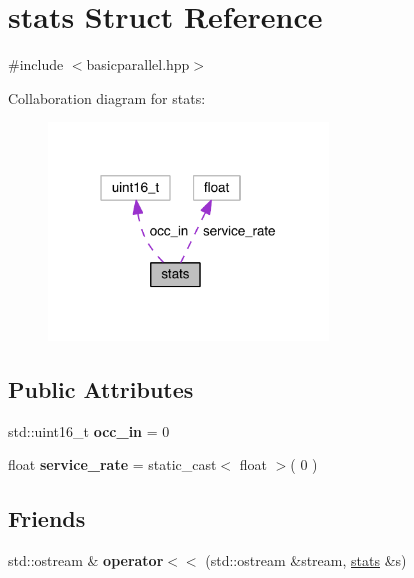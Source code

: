 \hypertarget{structstats}{}\section{stats Struct Reference}
\label{structstats}


{\ttfamily \#include $<$basicparallel.\+hpp$>$}



Collaboration diagram for stats\+:
\nopagebreak
\begin{figure}[H]
\begin{center}
\leavevmode
\includegraphics[width=211pt]{structstats__coll__graph}
\end{center}
\end{figure}
\subsection*{Public Attributes}
\begin{DoxyCompactItemize}
\item 
\hypertarget{structstats_a85ea5e0c637b929216e86a55c1b83264}{}\label{structstats_a85ea5e0c637b929216e86a55c1b83264} 
std\+::uint16\+\_\+t {\bfseries occ\+\_\+in} = 0
\item 
\hypertarget{structstats_ad223443981e12cb0aefd5b5bfe4a0e20}{}\label{structstats_ad223443981e12cb0aefd5b5bfe4a0e20} 
float {\bfseries service\+\_\+rate} = static\+\_\+cast$<$ float $>$( 0 )
\end{DoxyCompactItemize}
\subsection*{Friends}
\begin{DoxyCompactItemize}
\item 
\hypertarget{structstats_a964dc7f83480d5396550ec5586f1b72a}{}\label{structstats_a964dc7f83480d5396550ec5586f1b72a} 
std\+::ostream \& {\bfseries operator$<$$<$} (std\+::ostream \&stream, \hyperlink{structstats}{stats} \&s)
\end{DoxyCompactItemize}


